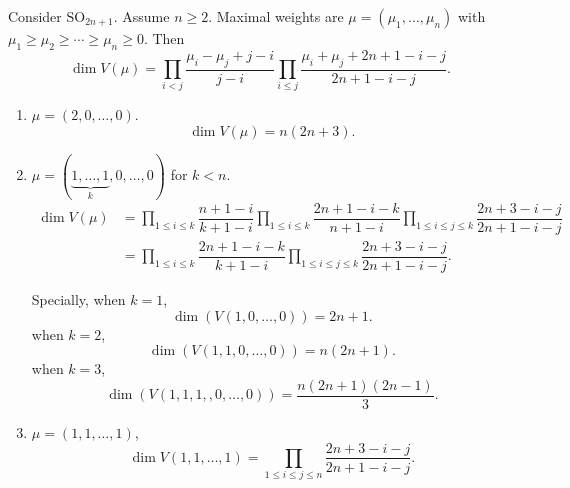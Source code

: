\documentclass[a4paper]{amsart}
\newcommand{\SO}{{\mathrm{SO}}}\newcommand{\so}{\mathfrak{so}}
\theoremstyle{plain}
\theoremstyle{remark} \newtheorem{remark}[thm]{Remark}
\theoremstyle{remark} \newtheorem{exercise}{Exercise}
\theoremstyle{remark} \newtheorem{example}{Example}
\numberwithin{equation}{section}
\begin{document}
Consider $\SO_{2n+1}$. Assume $n\geqslant 2$. Maximal weights are $\mu=(\mu_1,\dots,\mu_n)$ with $\mu_1\geqslant \mu_2\geqslant \cdots\geqslant \mu_n\geqslant 0$. Then 
\begin{equation}\label{dimension of representation of SO(2n+1)}
\dim V(\mu)=\prod_{i<j}\frac{\mu_i-\mu_j+j-i}{j-i}\prod_{i\leqslant j}\frac{\mu_i+\mu_j+2n+1-i-j}{2n+1-i-j}.\end{equation}

\begin{enumerate}
		\item $\mu=(2,0,\ldots,0)$.
		\begin{equation}\label{case 1}
		    \dim V(\mu)=n(2n+3).
		\end{equation}
		\item $\mu=(\underbrace{1,\ldots,1}_k,0,\ldots,0)$ for $k<n$.
		\begin{equation}\label{case 2}
		    \begin{aligned}
		    \dim V(\mu)&=\prod_{1\leqslant i\leqslant k}\dfrac{n+1-i}{k+1-i}\prod_{1\leqslant i\leqslant k}\dfrac{2n+1-i-k}{n+1-i}\prod_{1\leqslant i\leqslant j\leqslant k}\dfrac{2n+3-i-j}{2n+1-i-j}\\
            &=\prod_{1\leqslant i\leqslant k}\dfrac{2n+1-i-k}{k+1-i}\prod_{1\leqslant i\leqslant j\leqslant k}\dfrac{2n+3-i-j}{2n+1-i-j}.
		\end{aligned}
		\end{equation}

        Specially, when $k=1$, 
        \begin{equation}\label{case 2.1}
            \dim(V(1,0,\dots,0))=2n+1.
        \end{equation}
        when $k=2$, 
        \begin{equation}\label{case 2.2}
            \dim(V(1,1,0,\dots,0))=n(2n+1).
        \end{equation}
        when $k=3$,
        \begin{equation}\label{case 2.3}
            \dim(V(1,1,1,,0,\dots,0))=\dfrac{n(2n+1)(2n-1)}{3}.
        \end{equation}
       \item $\mu=(1,1,\dots,1)$, 
    \begin{equation}\label{case 3}
         \dim V(1,1,\dots,1)=\prod_{1\leqslant i\leqslant j\leqslant n}\dfrac{2n+3-i-j}{2n+1-i-j}.
    \end{equation}
   
\end{enumerate}
\end{document}
